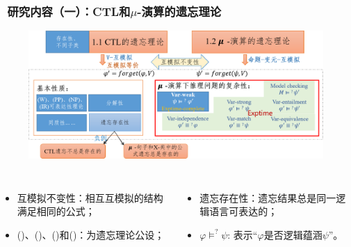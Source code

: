 \documentclass[aspectratio=1610, 9pt, CJK]{beamer}
\begin{document}
\begin{frame}  
	\frametitle{~研究内容（一）：CTL和$\mu$-演算的遗忘理论}
	\begin{figure}
		\includegraphics[scale=0.45]{figures/ctlMuForgFrame3}
	\end{figure}
	{\tiny 
		\begin{columns}
			\begin{itemize} 
				\item 互模拟不变性：相互互模拟的结构满足相同的公式；
				\item (\W)、(\PP)、(\NgP)和(\IR)：为遗忘理论公设；
			\end{itemize}
			\begin{itemize}
				\item 遗忘存在性：遗忘结果总是同一逻辑语言可表达的；
				\item $\varphi \models^? \psi$: 表示“$\varphi$是否逻辑蕴涵$\psi$”。
			\end{itemize}
		\end{columns}
	} 
\end{frame}
\end{document}
